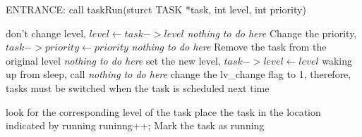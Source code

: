 \documentclass{standalone}
\begin{document}
\begin{algorithm}[H]
  \SetAlgoLined
  
  ENTRANCE: call taskRun{(sturct TASK *task, int level, int priority)}\;
  {
    {
      don't change level, $level \leftarrow task->level$\;
    }
    {
      \emph{nothing to do here}\;
    }
    {
      Change the priority, $task->priority \leftarrow priority$\;
    }
    {
      \emph{nothing to do here}\;
    }
    {
      Remove the task from the original level\;
    }
    {
      \emph{nothing to do here}\;
    }
    {
      set the new level, $task->level \leftarrow level$\;
      waking up from sleep, call \;
    }
    {
      \emph{nothing to do here}\;
    }
    change the lv\_change flag to 1, therefore, tasks must be switched when the task is
    scheduled next time\;
    
  }

  {
    look for the corresponding level of the task\;
    place the task in the location indicated by running\;
    runinng++;
    Mark the task as running\;
  }
  
\end{algorithm}
\end{document}
